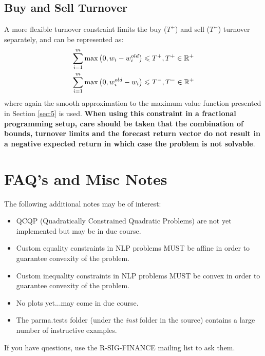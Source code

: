 \subsection{Buy and Sell Turnover}
A more flexible turnover constraint limits the buy ($T^+$) and sell ($T^-$) turnover separately, and can be represented as:
\begin{equation}
\begin{gathered}
  \sum\limits_{i = 1}^m {\max \left( {0,{w_i} - w_i^{old}} \right) \leqslant {T^ + },{T^ + } \in {\mathbb{R}^ + }}  \hfill \\
  \sum\limits_{i = 1}^m {\max \left( {0,w_i^{old} - {w_i}} \right) \leqslant {T^ - },{T^ - } \in {\mathbb{R}^ + }}  \hfill \\
\end{gathered}
\end{equation}
where again the smooth approximation to the maximum value function presented in Section \ref{sec:5} is used. \textbf{When using this
constraint in a fractional programming setup, care should be taken that the combination of bounds, turnover limits and the forecast return
vector do not result in a negative expected return in which case the problem is not solvable}.

\section{FAQ's and Misc Notes}\label{sec:7}
The following additional notes may be of interest:
\begin{itemize}
\item QCQP (Quadratically Constrained Quadratic Problems) are not yet
    implemented but may be in due course.
\item Custom equality constraints in NLP problems MUST be affine in order
    to  guarantee convexity of the problem.
\item Custom inequality constraints in NLP problems MUST be convex in
    order to  guarantee convexity of the problem.
\item No plots yet...may come in due course.
\item The parma.tests folder (under the \emph{inst} folder in the source)
    contains a large number of instructive examples.
\end{itemize}
If you have questions, use the R-SIG-FINANCE mailing list to ask them.\\ 